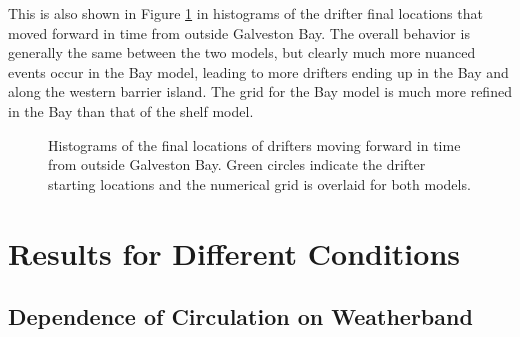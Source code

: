 \documentclass[11pt]{article}
\begin{document}
This is also shown in Figure \ref{fig:bayhexbin} in histograms of the drifter final locations that moved forward in time from outside Galveston Bay. The overall behavior is generally the same between the two models, but clearly much more nuanced events occur in the Bay model, leading to more drifters ending up in the Bay and along the western barrier island. The grid for the Bay model is much more refined in the Bay than that of the shelf model.

\begin{figure}
    \centering
    \caption{Histograms of the final locations of drifters moving forward in time from outside Galveston Bay. Green circles indicate the drifter starting locations and the numerical grid is overlaid for both models.}
    \label{fig:bayhexbin}
\end{figure}

\section{Results for Different Conditions}

\subsection{Dependence of Circulation on Weatherband}
\end{document}
